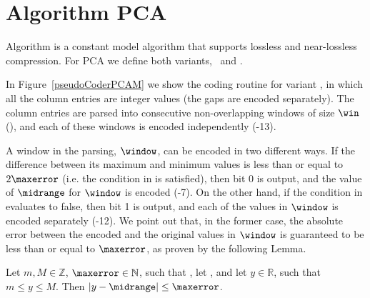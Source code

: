 
\newcommand{\WindowParam}{}

\newcommand{\BothVariantsOne}[1]{For {#1} we define both variants, \maskalgo\ and \NOmaskalgo}
\newcommand{\BothVariantsTwo}[1]{{#1} supports both variants, \maskalgo\ and \NOmaskalgo}
\newcommand{\SingleVariant}[1]{For {#1} we define a single variant, \maskalgo}


\clearpage
\section{Algorithm PCA}
\label{algo:pca}


\vspace{-5pt}
Algorithm \textit{\PCAfull} \cite{coder:pca} is a constant model algorithm that supports lossless and near-lossless compression.  \WindowParam \BothVariantsOne{PCA}.


In Figure~\ref{pseudoCoderPCAM} we show the coding routine for variant \maskalgo, in which all the column entries are integer values (the gaps are encoded separately). The column entries are parsed into consecutive non-overlapping windows of size $\win$ (), and each of these windows is encoded independently (-13). 





A window in the parsing, $\window$, can be encoded in two different ways. If the difference between its maximum and minimum values is less than or equal to $2\maxerror$ (i.e. the condition in  is satisfied), then bit 0 is output, and the value of $\midrange$ for $\window$ is encoded (-7). On the other hand, if the condition in  evaluates to false, then bit 1 is output, and each of the values in $\window$ is encoded separately (-12). We point out that, in the former case, the absolute error between the encoded and the original values in $\window$ is guaranteed to be less than or equal to $\maxerror$, as proven by the following Lemma.


\begin{lemma}
\label{lemma:pca}
\textnormal{
Let $m, M\in \mathbb{Z}$, $\maxerror \in \mathbb{N}$, such that \validThreTwo, let \calculateMidrange, and let $y\in \mathbb{R}$, such that $m\leq y\leq M$. Then $|y-\midrange|\leq \maxerror$.
}
\end{lemma}

